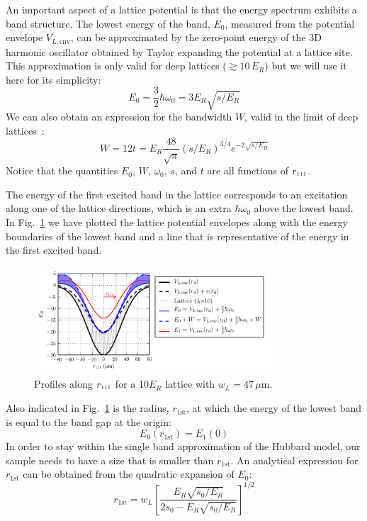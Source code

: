 \documentclass[11pt,letter]{article}
\newcommand{\rdiag}{\ensuremath{ r_{\text{\tiny{111}}} } }
\begin{document}
An important aspect of a lattice potential is that the energy spectrum exhibits
a band structure.  The lowest energy of the band, $E_{0}$, measured from the
potential envelope $V_{L,\text{env}}$, can be approximated by the zero-point
energy of the 3D harmonic oscillator obtained by Taylor expanding the potential
at a lattice site.   This approximation is only valid for deep lattices
($\gtrsim 10\,E_{R}$) but we will use it here for its simplicity: 
\begin{equation}
  E_{0} = 
     \frac{3}{2} \hbar \omega_{0}  = 3E_{R}\sqrt{ s/E_{R} } 
\end{equation} 
We can also obtain an expression for the bandwidth $W$, valid in the limit of
deep lattices~\cite{Bloch2008}:
\begin{equation}
  W =   12 t 
  = E_{R}\frac{48}{\sqrt{\pi}} (s/E_{R})^{3/4} e^{-2\sqrt{s/E_{R}}} 
\end{equation}
Notice that the quantities $E_{0}$, $W$, $\omega_{0}$, $s$, and $t$ are all
functions of $\rdiag$. 

The energy of the first excited band in the lattice corresponds to an
excitation along one of the lattice directions, which is an extra $\hbar
\omega_{0}$  above the lowest band.  In Fig.~\ref{fig:lattice_general} we have
plotted the lattice potential envelopes along with the energy boundaries of the
lowest band and a line that is representative of the energy in the  first
excited band.  
\begin{figure}
    \centering
    \includegraphics[width=0.8\textwidth]{figures/lattice_general.png}
    \caption{Profiles along $\rdiag$ for a 10$E_{R}$ lattice with $w_{L}=47\,\mu$m. }
\label{fig:lattice_general}
\end{figure}
Also indicated in Fig.~\ref{fig:lattice_general} is the radius,
$r_{1\text{st}}$, at which the energy of the lowest band is equal to the band
gap at the origin:
\begin{equation}
  E_{0}(r_{1\text{st}} )  = 
  E_{1}(0 )  
\end{equation} 
 In order to stay within the single band approximation of the Hubbard model,
our sample needs to have a size that is smaller than $r_{1\text{st}}$.   An
analytical expression for $r_{1\text{st}}$ can be obtained from the quadratic
expansion of $E_{0}$: 
\begin{equation}
 r_{1\text{st}} = w_{L} \left[ \frac{E_{R}\sqrt{s_{0}/E_{R}}}
                              {2s_{0}-E_{R}\sqrt{s_{0}/E_{R}}}  \right]^{1/2} 
\label{eq:r1st} 
\end{equation} 
\end{document}
